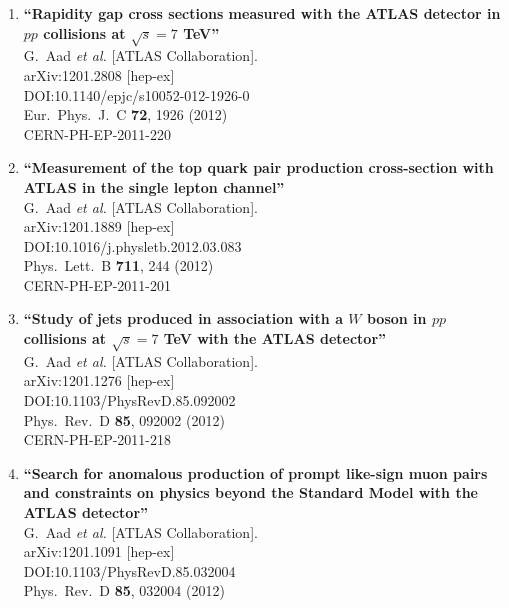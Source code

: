 \documentclass{article}
\begin{document}
\begin{enumerate}
\item%
{\bf ``Rapidity gap cross sections measured with the ATLAS detector in $pp$ collisions at $\sqrt{s}=7$ TeV''}
  \\{}G.~Aad {\it et al.} [ATLAS Collaboration].
  \\{}arXiv:1201.2808 [hep-ex]
  \\{}DOI:10.1140/epjc/s10052-012-1926-0
  \\{}Eur.\ Phys.\ J.\ C {\bf 72}, 1926 (2012)
  \\{}CERN-PH-EP-2011-220
\item%
{\bf ``Measurement of the top quark pair production cross-section with ATLAS in the single lepton channel''}
  \\{}G.~Aad {\it et al.} [ATLAS Collaboration].
  \\{}arXiv:1201.1889 [hep-ex]
  \\{}DOI:10.1016/j.physletb.2012.03.083
  \\{}Phys.\ Lett.\ B {\bf 711}, 244 (2012)
  \\{}CERN-PH-EP-2011-201
\item%
{\bf ``Study of jets produced in association with a $W$ boson in $pp$ collisions at $\sqrt{s}=7$ TeV with the ATLAS detector''}
  \\{}G.~Aad {\it et al.} [ATLAS Collaboration].
  \\{}arXiv:1201.1276 [hep-ex]
  \\{}DOI:10.1103/PhysRevD.85.092002
  \\{}Phys.\ Rev.\ D {\bf 85}, 092002 (2012)
  \\{}CERN-PH-EP-2011-218
\item%
{\bf ``Search for anomalous production of prompt like-sign muon pairs and constraints on physics beyond the Standard Model with the ATLAS detector''}
  \\{}G.~Aad {\it et al.} [ATLAS Collaboration].
  \\{}arXiv:1201.1091 [hep-ex]
  \\{}DOI:10.1103/PhysRevD.85.032004
  \\{}Phys.\ Rev.\ D {\bf 85}, 032004 (2012)

\end{enumerate}
\end{document}
